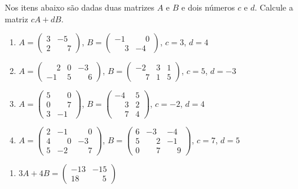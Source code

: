 \documentclass[12pt]{exam}
\begin{document}
\begin{exercicio}
    Nos itens abaixo são dadas duas matrizes $A$ e $B$ e dois números $c$ e $d$. Calcule a matriz $cA + dB$.
    \begin{enumerate}[label={\alph*})]
        \item $A = \begin{pmatrix}3 & -5\\2 & \phantom{-} 7\end{pmatrix}$, $B = \begin{pmatrix}-1 & \phantom{-} 0\\\phantom{-} 3 & -4\end{pmatrix}$, $c = 3$, $d = 4$
        \item $A = \begin{pmatrix}\phantom{-} 2 & 0 & -3\\-1 & 5 & \phantom{-} 6\end{pmatrix}$, $B = \begin{pmatrix}-2 & 3 & 1\\\phantom{-} 7 & 1 & 5\end{pmatrix}$, $c = 5$, $d = -3$
        \item $A = \begin{pmatrix}5 & \phantom{-} 0\\0 & \phantom{-} 7\\3 & -1\end{pmatrix}$, $B = \begin{pmatrix}-4 & 5\\\phantom{-} 3 & 2\\\phantom{-} 7 & 4\end{pmatrix}$, $c = -2$, $d = 4$
        \item $A = \begin{pmatrix}2 & -1 & \phantom{-} 0\\4 & \phantom{-} 0 & -3\\5 & -2 & \phantom{-} 7\end{pmatrix}$, $B = \begin{pmatrix}6 & -3 & -4\\5 & \phantom{-} 2 & -1\\0 & \phantom{-} 7 & \phantom{-} 9\end{pmatrix}$, $c = 7$, $d = 5$
    \end{enumerate}
    \begin{solucao}
        \begin{enumerate}[label={\alph*})]
            \item $3A + 4B = \begin{pmatrix}-13 & -15\\18 & \phantom{-} 5\end{pmatrix}$

\end{enumerate}
\end{solucao}
\end{exercicio}
\end{document}
